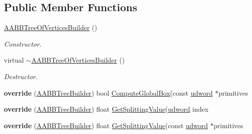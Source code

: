 \subsection*{Public Member Functions}
\begin{DoxyCompactItemize}
\item 
\hyperlink{classOpcode_1_1AABBTreeOfVerticesBuilder_a48f3934dd8959c866c932f092d825e2e}{A\+A\+B\+B\+Tree\+Of\+Vertices\+Builder} ()\hypertarget{classOpcode_1_1AABBTreeOfVerticesBuilder_a48f3934dd8959c866c932f092d825e2e}{}\label{classOpcode_1_1AABBTreeOfVerticesBuilder_a48f3934dd8959c866c932f092d825e2e}

\begin{DoxyCompactList}\small\item\em Constructor. \end{DoxyCompactList}\item 
virtual \hyperlink{classOpcode_1_1AABBTreeOfVerticesBuilder_a08a85f0c468469523d869bad6a500193}{$\sim$\+A\+A\+B\+B\+Tree\+Of\+Vertices\+Builder} ()\hypertarget{classOpcode_1_1AABBTreeOfVerticesBuilder_a08a85f0c468469523d869bad6a500193}{}\label{classOpcode_1_1AABBTreeOfVerticesBuilder_a08a85f0c468469523d869bad6a500193}

\begin{DoxyCompactList}\small\item\em Destructor. \end{DoxyCompactList}\item 
{\bfseries override} (\hyperlink{classOpcode_1_1AABBTreeBuilder}{A\+A\+B\+B\+Tree\+Builder}) bool \hyperlink{classOpcode_1_1AABBTreeBuilder_a7d9fe535e2dd4649b58b416e9ef63ae8}{Compute\+Global\+Box}(const \hyperlink{IceTypes_8h_a44c6f1920ba5551225fb534f9d1a1733}{udword} $\ast$primitives\hypertarget{classOpcode_1_1AABBTreeOfVerticesBuilder_a8545b5961eab1a183d19930eebd79f15}{}\label{classOpcode_1_1AABBTreeOfVerticesBuilder_a8545b5961eab1a183d19930eebd79f15}

\item 
{\bfseries override} (\hyperlink{classOpcode_1_1AABBTreeBuilder}{A\+A\+B\+B\+Tree\+Builder}) float \hyperlink{classOpcode_1_1AABBTreeBuilder_ab98a8fb0617c8ec21eadc51c9ff593d4}{Get\+Splitting\+Value}(\hyperlink{IceTypes_8h_a44c6f1920ba5551225fb534f9d1a1733}{udword} index\hypertarget{classOpcode_1_1AABBTreeOfVerticesBuilder_ac3ab611428fcf47c51efda70b583a837}{}\label{classOpcode_1_1AABBTreeOfVerticesBuilder_ac3ab611428fcf47c51efda70b583a837}

\item 
{\bfseries override} (\hyperlink{classOpcode_1_1AABBTreeBuilder}{A\+A\+B\+B\+Tree\+Builder}) float \hyperlink{classOpcode_1_1AABBTreeBuilder_ab98a8fb0617c8ec21eadc51c9ff593d4}{Get\+Splitting\+Value}(const \hyperlink{IceTypes_8h_a44c6f1920ba5551225fb534f9d1a1733}{udword} $\ast$primitives\hypertarget{classOpcode_1_1AABBTreeOfVerticesBuilder_a7944155f6aeaae4f8bf7fc9551cd8322}{}\label{classOpcode_1_1AABBTreeOfVerticesBuilder_a7944155f6aeaae4f8bf7fc9551cd8322}

\end{DoxyCompactItemize}
